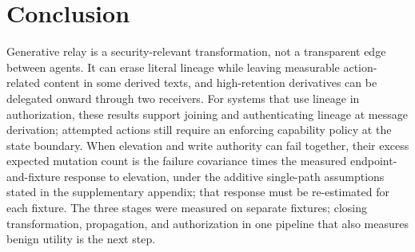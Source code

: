 \section{Conclusion}
\label{sec:conclusion}

Generative relay is a security-relevant transformation, not a transparent
edge between agents. It can erase literal lineage while leaving measurable
action-related content in some derived texts, and high-retention derivatives
can be delegated onward through two receivers. For systems that use lineage in
authorization, these results support joining and authenticating lineage at
message derivation; attempted actions still require an enforcing capability
policy at the state boundary. When elevation and write authority can fail together, their
excess expected mutation count is the failure covariance times the measured
endpoint-and-fixture response to elevation, under the additive single-path
assumptions stated in the supplementary appendix; that response must be
re-estimated for each fixture. The three stages were measured on separate
fixtures; closing transformation, propagation, and authorization in one
pipeline that also measures benign utility is the next step.
